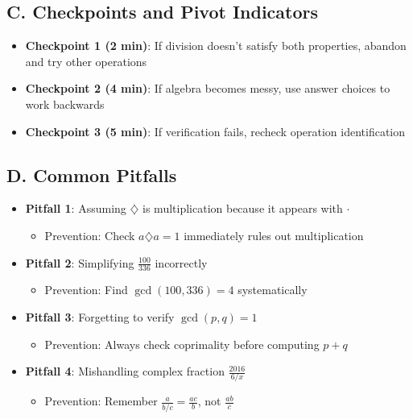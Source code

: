 \documentclass[11pt]{article}
\begin{document}
\begin{roadmapbox}
\subsection*{C. Checkpoints and Pivot Indicators}
\begin{itemize}[leftmargin=*]
    \item \textbf{Checkpoint 1 (2 min)}: If division doesn't satisfy both properties, abandon and try other operations
    \item \textbf{Checkpoint 2 (4 min)}: If algebra becomes messy, use answer choices to work backwards
    \item \textbf{Checkpoint 3 (5 min)}: If verification fails, recheck operation identification
\end{itemize}

\subsection*{D. Common Pitfalls}
\begin{itemize}[leftmargin=*]
    \item \textbf{Pitfall 1}: Assuming $\diamondsuit$ is multiplication because it appears with $\cdot$
    \begin{itemize}
        \item Prevention: Check $a \diamondsuit a = 1$ immediately rules out multiplication
    \end{itemize}
    
    \item \textbf{Pitfall 2}: Simplifying $\frac{100}{336}$ incorrectly
    \begin{itemize}
        \item Prevention: Find $\gcd(100, 336) = 4$ systematically
    \end{itemize}
    
    \item \textbf{Pitfall 3}: Forgetting to verify $\gcd(p, q) = 1$
    \begin{itemize}
        \item Prevention: Always check coprimality before computing $p+q$
    \end{itemize}
    
    \item \textbf{Pitfall 4}: Mishandling complex fraction $\frac{2016}{6/x}$
    \begin{itemize}
        \item Prevention: Remember $\frac{a}{b/c} = \frac{ac}{b}$, not $\frac{ab}{c}$
    \end{itemize}
\end{itemize}
\end{roadmapbox}
\end{document}
